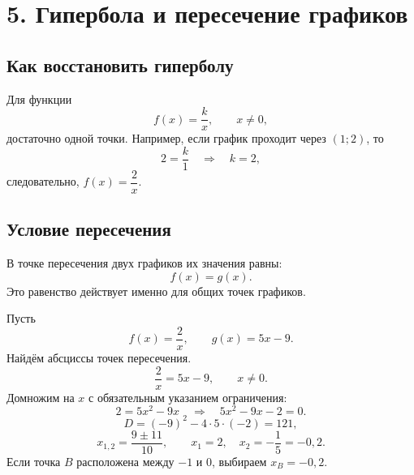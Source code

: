 \documentclass[a4paper,12pt]{article}
\begin{document}
\begin{center}
\end{center}

\section*{5. Гипербола и пересечение графиков}
\subsection*{Как восстановить гиперболу}
Для функции
\[
f(x)=\frac{k}{x},\qquad x\ne0,
\]
достаточно одной точки. Например, если график проходит через $(1;2)$, то
\[
2=\frac{k}{1}\quad\Longrightarrow\quad k=2,
\]
следовательно, $f(x)=\dfrac2x$.

\subsection*{Условие пересечения}
В точке пересечения двух графиков их значения равны:
\[
f(x)=g(x).
\]
Это равенство действует именно для общих точек графиков.

\begin{examplebox}
Пусть
\[
f(x)=\frac2x,\qquad g(x)=5x-9.
\]
Найдём абсциссы точек пересечения.
\[
\frac2x=5x-9,\qquad x\ne0.
\]
Домножим на $x$ с обязательным указанием ограничения:
\[
2=5x^2-9x \quad\Longrightarrow\quad 5x^2-9x-2=0.
\]
\[
D=(-9)^2-4\cdot5\cdot(-2)=121,
\]
\[
x_{1,2}=\frac{9\pm11}{10},\qquad x_1=2,\quad x_2=-\frac15=-0{,}2.
\]
Если точка $B$ расположена между $-1$ и $0$, выбираем $x_B=-0{,}2$.
\end{examplebox}
\end{document}
